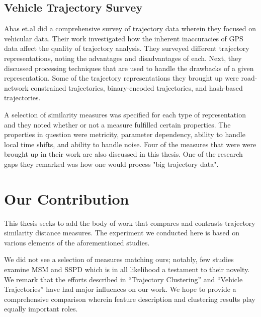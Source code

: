 \subsection{Vehicle Trajectory Survey}
Abas et.al did a comprehensive survey of trajectory data\cite{85-VehicleTrajectory} wherein they focused on vehicular data. 
Their work investigated how the inherent inaccuracies of GPS data affect the quality of trajectory analysis.
They surveyed different trajectory representations, noting the advantages and disadvantages of each. 
Next, they discussed processing techniques that are used to handle the drawbacks of a given representation. 
Some of the trajectory representations they brought up were road-network constrained trajectories, binary-encoded trajectories, and hash-based trajectories. 


A selection of similarity measures was specified for each type of representation and they noted whether or not a measure fulfilled certain properties. 
The properties in question were metricity, parameter dependency, ability to handle local time shifts, and ability to handle noise. 
Four of the measures that were were brought up in their work are also discussed in this thesis. One of the research gaps they remarked was how one would process  "big trajectory data".
 
 
\section{Our Contribution}

This thesis seeks to add the body of work that compares and contrasts trajectory similarity distance measures.
The experiment we conducted here is based on various elements of the aforementioned studies. 

We did not see a selection of measures matching ours; notably, few studies examine MSM and SSPD which is in all likelihood a testament to their novelty. 
We remark that the efforts described in  “Trajectory Clustering” and “Vehicle Trajectories” have had major influences on our work. 
We hope to provide a comprehensive comparison wherein feature description and clustering results play equally important roles.


